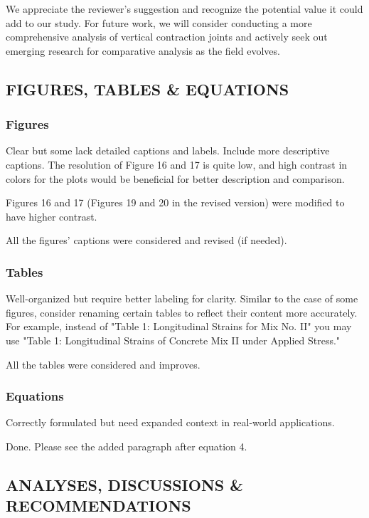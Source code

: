 \documentclass{ar2rc}
\begin{document}
{	We appreciate the reviewer's suggestion and recognize the potential value it could add to our study. For future work, we will consider conducting a more comprehensive analysis of vertical contraction joints and actively seek out emerging research for comparative analysis as the field evolves.

	\subsection{FIGURES, TABLES \& EQUATIONS}
	\subsubsection{Figures}


	\RC Clear but some lack detailed captions and labels. Include more descriptive captions. The resolution of Figure 16 and 17 is quite low, and high contrast in colors for the plots would be beneficial for better description and comparison.

	\AR Figures 16 and 17 (Figures 19 and 20 in the revised version) were modified to have higher contrast. 
	
	All the figures' captions were considered and revised (if needed).
 
	\subsubsection{Tables}
	
	\RC Well-organized but require better labeling for clarity. Similar to the case of some figures, consider renaming certain tables to reflect their content more accurately. For example, instead of "Table 1: Longitudinal Strains for Mix No. II"	you may use "Table 1: Longitudinal Strains of Concrete Mix II under Applied Stress."

	\AR All the tables were considered and improves. 

	\subsubsection{Equations}
	\RC Correctly formulated but need expanded context in real-world applications.
	
	\AR Done. Please see the added paragraph after equation 4.

	\subsection{ANALYSES, DISCUSSIONS \& RECOMMENDATIONS}
	
}
\end{document}
